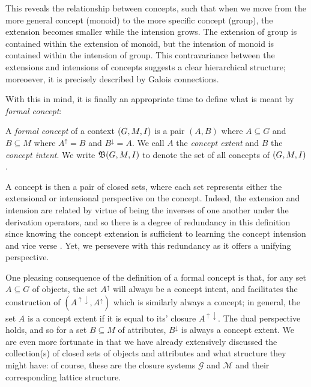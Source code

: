 This reveals the relationship between concepts, such that when we move from the more general concept (monoid) to the more specific concept (group),
the extension becomes smaller while the intension grows. The extension of group is contained within the extension of monoid, but the
intension of monoid is contained within the intension of group. This contravariance between the extensions and intensions of concepts suggests
a clear hierarchical structure; moreoever, it is precisely described by Galois connections.

With this in mind, it is finally an appropriate time to define what is meant by \textit{formal concept}:

\begin{definition}
    \label{definition:formal-concept} A \emph{formal concept} of a context $(G,M,\mathrel{I})$ is a
  pair $(A,B)$ where $A \subseteq G$ and $B\subseteq M$ where $A^{\uparrow}= B$ and $B^{\downarrow}= A$. We call $A$ the \emph{concept
  extent} and $B$ the \emph{concept intent}. We write ${\mathfrak B} (G,M,\mathrel{I})$ to denote the set of all concepts of $(G,M,\mathrel{I})$.
\end{definition}

A concept is then a pair of closed sets, where each set represents either the extensional or intensional perspective on the concept. Indeed,
the extension and intension are related by virtue of being the inverses of one another under the derivation operators, and so there is a
degree of redundancy in this definition since knowing the concept extension is sufficient to learning the concept intension and vice verse
\cite{ganter2016conceptual}. Yet, we persevere with this redundancy as it offers a unifying perspective.

One pleasing consequence of the definition of a formal concept is that, for any set $A\subseteq G$ of objects, the set $A^{\uparrow}$ will
always be a concept intent, and facilitates the construction of $(A^{\uparrow \downarrow}, A^{\uparrow})$ which is similarly always a concept;
in general, the set $A$ is a concept extent if it is equal to its' closure $A^{\uparrow \downarrow}$. The dual perspective holds, and so for
a set $B \subseteq M$ of attributes, $B^{\downarrow}$ is always a concept extent. We are even more fortunate in that we have already
extensively discussed the collection(s) of closed sets of objects and attributes and what structure they might have: of course, these are the
closure systems $\mathcal{G}$ and $\mathcal{M}$ and their corresponding lattice structure.

